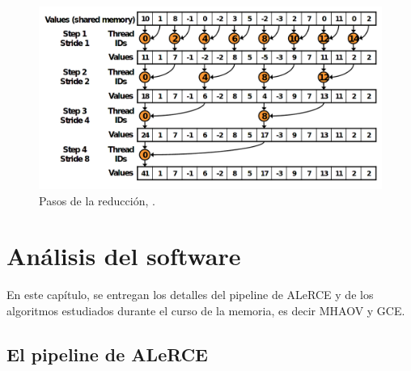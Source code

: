 \begin{figure}[H]
    \centering
    \includegraphics[width=1.0\textwidth]{figs/reduccion.png}
    \caption{Pasos de la reducción, \cite{harris-reduction}.}
    \label{fig:cuda-reduccion}
\end{figure}


\chapter{Análisis del software}\label{chap:analisis}

En este capítulo, se entregan los detalles del pipeline de ALeRCE y de los algoritmos estudiados durante el curso de la memoria, es decir MHAOV y GCE.

\section{El pipeline de ALeRCE}\label{sec:alerce-pipeline}

